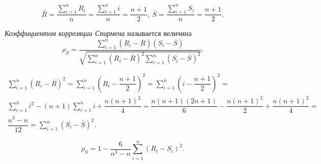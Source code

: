 \begin{equation*}
    \overline{R} =\dfrac{\sum _{i=1}^{n} R_{i}}{n} =\dfrac{\sum _{i=1}^{n} i}{n} =\dfrac{n+1}{2} ,\ \overline{S} =\dfrac{\sum _{i=1}^{n} S_{i}}{n} =\dfrac{n+1}{2} .
\end{equation*}
\begin{definition}
    \textit{Коэффициентом корреляции Спирмена} называется величина
    \begin{equation*}
        \rho _{S} =\dfrac{\sum _{i=1}^{n}\left( R_{i} -\overline{R}\right)\left( S_{i} -\overline{S}\right)}{\sqrt{\sum _{i=1}^{n}\left( R_{i} -\overline{R}\right)^{2}\sum _{i=1}^{n}\left( S_{i} -\overline{S}\right)^{2}}} .
    \end{equation*}
\end{definition}
\begin{note}
    \begin{gather*}
        \sum _{i=1}^{n}\left( R_{i} -\overline{R}\right)^{2} =\sum _{i=1}^{n}\left( R_{i} -\dfrac{n+1}{2}\right)^{2} =\sum _{i=1}^{n}\left( i-\dfrac{n+1}{2}\right)^{2} =\\
        \sum _{i=1}^{n} i^{2} -\left( n+1\right)\sum _{i=1}^{n} i+\dfrac{n\left( n+1\right)^{2}}{4} =\dfrac{n\left( n+1\right)\left( 2n+1\right)}{6} -\dfrac{n\left( n+1\right)^{2}}{2} +\dfrac{n\left( n+1\right)^{2}}{4} =\\
        \dfrac{n^{3} -n}{12} =\sum _{i=1}^{n}\left( S_{i} -\overline{S}\right)^{2} .
    \end{gather*}
\end{note}
\begin{proposition}
    \begin{equation*}
        \rho _{S} =1-\dfrac{6}{n^{3} -n}\sum _{i=1}^{n}\left( R_{i} -S_{i}\right)^{2} .
    \end{equation*}
\end{proposition}
